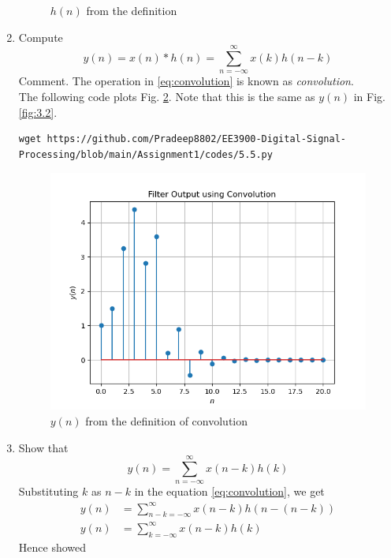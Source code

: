 \documentclass[journal,12pt,twocolumn]{IEEEtran}
\renewcommand\thesection{\arabic{section}}
\begin{document}
\begin{enumerate}[label=\thesection.\arabic*]
\begin{figure}[!ht]
\caption{$h(n)$ from the definition}
\label{fig:5.4}
\end{figure}
%
\item Compute 
%
\begin{equation}
\label{eq:convolution}
y(n) = x(n)*h(n) = \sum_{n=-\infty}^{\infty}x(k)h(n-k)
\end{equation}
%
Comment. The operation in \eqref{eq:convolution} is known as
{\em convolution}.
%
\\
\solution The following code plots Fig. \ref{fig:5.5}. Note that this is the same as 
$y(n)$ in  Fig. 
\ref{fig:3.2}. 
%
\begin{lstlisting}
wget https://github.com/Pradeep8802/EE3900-Digital-Signal-Processing/blob/main/Assignment1/codes/5.5.py
\end{lstlisting}
\begin{figure}[!ht]
\centering
\includegraphics[width=\columnwidth]{./figs/5.5}
\caption{$y(n)$ from the definition of convolution}
\label{fig:5.5}
\end{figure}

\item Show that
\begin{equation}
y(n) =  \sum_{n=-\infty}^{\infty}x(n-k)h(k)
\end{equation}
\solution Substituting $k$ as $n-k$ in the equation \eqref{eq:convolution}, we get
\begin{align}
	y(n) &= \sum_{n-k=-\infty}^{\infty}x(n-k)h(n-(n-k))\\
	y(n) &= \sum_{k=-\infty}^{\infty}x(n-k)h(k)
\end{align}
Hence showed
\end{enumerate}
%
\end{document}
